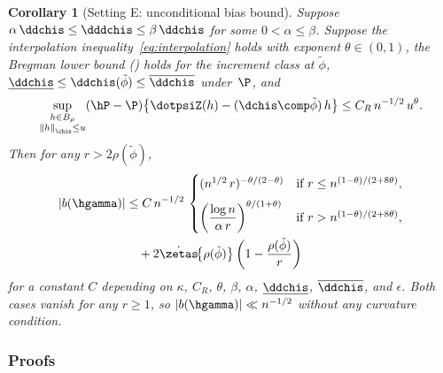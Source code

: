 \documentclass{article}
\newtheorem{corollary}[theorem]{Corollary}
\newcommand{\theoremvariant}[1]{%
  \setcounter{theorem}{\numexpr\variantbase-1\relax}%
  \renewcommand{\thetheorem}{\thesection.\variantbase\textup{#1}}%
}
\newcommand{\resettheorem}{%
  \renewcommand{\thetheorem}{\thesection.\arabic{theorem}}%
}
\begin{document}
\theoremvariant{E}
\begin{corollary}[Setting E: unconditional bias bound]
\label{cor:unconditional-bias}
Suppose $\alpha\, \ddchis \le \dddchis \le \beta\, \ddchis$
for some $0 < \alpha \le \beta$.
Suppose the interpolation inequality~\eqref{eq:interpolation}
holds with exponent $\theta \in (0,1)$,
the Bregman lower bound
()
holds for the increment class at $\tilde\phi$,
$\underline{\ddchis} \le \ddchis(\tilde\phi) \le \overline{\ddchis}$ under~$\P$,
and
\[
\sup_{\substack{h \in B_\rho \\
    \norm{h}_{\chis} \le u}}
  (\hP - \P)\qty{\dotpsiZ(h) - (\dchis \comp \tilde\phi)\,h}
  \le C_R\, n^{-1/2}\, u^\theta.
\]
Then for any $r > 2\rho(\tilde\phi)$,
\begin{equation}
\label{eq:unconditional-bias}
\begin{aligned}
|b(\hgamma)|
  &\le C\, n^{-1/2}\,
  \begin{cases}
    (n^{1/2}\, r)^{-\theta/(2-\theta)}
      & \text{if } r \le n^{(1-\theta)/(2+8\theta)}, \\[6pt]
    \qty(\dfrac{\log n}{\alpha\, r})^{\theta/(1+\theta)}
      & \text{if } r > n^{(1-\theta)/(2+8\theta)},
  \end{cases} \\
  &\quad + 2\dot\zetas\!\qty{\rho(\tilde\phi)}\,
  \qty(1 - \frac{\rho(\tilde\phi)}{r})
\end{aligned}
\end{equation}
for a constant $C$ depending on
$\kappa$, $C_R$, $\theta$,
$\beta$, $\alpha$, $\underline{\ddchis}$, $\overline{\ddchis}$,
and $\epsilon$.
Both cases vanish for any $r \ge 1$,
so $|b(\hgamma)| \ll n^{-1/2}$
without any curvature condition.
\end{corollary}
\resettheorem

\subsubsection*{Proofs}
\end{document}
